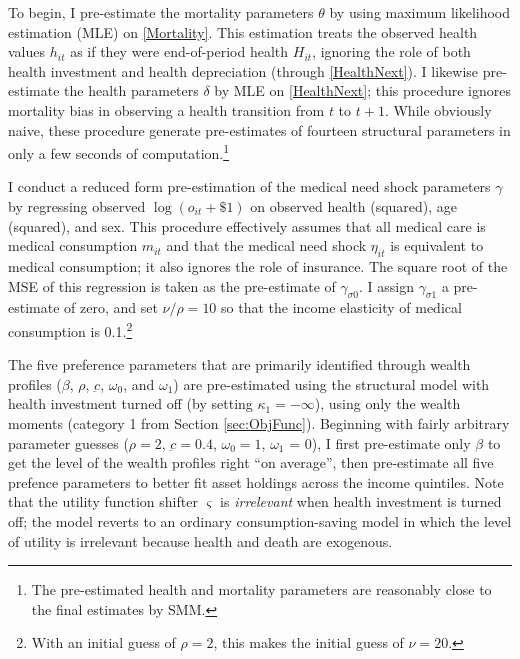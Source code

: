 \documentclass[12pt,pdftex,letterpaper]{article}
\newcommand{\Health}{h}
\newcommand{\PostHealth}{H}
\newcommand{\Con}{c}
\newcommand{\Care}{m}
\newcommand{\MedShkParam}{\gamma}
\newcommand{\DiscFac}{\beta}
\newcommand{\OOP}{o}
\newcommand{\ConFloor}{\underbar{\Con}}
\newcommand{\LifeUtility}{\varsigma}
\newcommand{\CRRAcon}{\rho}
\newcommand{\CRRAcare}{\nu}
\newcommand{\HealthParam}{\delta}
\newcommand{\MedShk}{\eta}
\newcommand{\MortParam}{\theta}
\newcommand{\BequestParam}{\omega}
\newcommand{\HealthProdParam}{\kappa}
\begin{document}
To begin, I pre-estimate the mortality parameters $\MortParam$ by using maximum likelihood estimation (MLE) on \eqref{Mortality}.  This estimation treats the observed health values $\Health_{it}$ as if they were end-of-period health $\PostHealth_{it}$, ignoring the role of both health investment and health depreciation (through \eqref{HealthNext}).  I likewise pre-estimate the health parameters $\HealthParam$ by MLE on \eqref{HealthNext}; this procedure ignores mortality bias in observing a health transition from $t$ to $t+1$.  While obviously naive, these procedure generate pre-estimates of fourteen structural parameters in only a few seconds of computation.\footnote{The pre-estimated health and mortality parameters are reasonably close to the final estimates by SMM.}

I conduct a reduced form pre-estimation of the medical need shock parameters $\MedShkParam$ by regressing observed $\log(\OOP_{it} + \$1)$ on observed health (squared), age (squared), and sex.  This procedure effectively assumes that all medical care is medical consumption $\Care_{it}$ and that the medical need shock $\MedShk_{it}$ is equivalent to medical consumption; it also ignores the role of insurance.  The square root of the MSE of this regression is taken as the pre-estimate of $\MedShkParam_{\sigma 0}$. I assign $\MedShkParam_{\sigma 1}$ a pre-estimate of zero, and set $\CRRAcare/\CRRAcon = 10$ so that the income elasticity of medical consumption is 0.1.\footnote{With an initial guess of $\CRRAcon = 2$, this makes the initial guess of $\CRRAcare=20$.}

The five preference parameters that are primarily identified through wealth profiles ($\DiscFac$, $\CRRAcon$, $\ConFloor$, $\BequestParam_0$, and $\BequestParam_1$) are pre-estimated using the structural model with health investment turned off (by setting $\HealthProdParam_1 = -\infty$), using only the wealth moments (category 1 from Section \ref{sec:ObjFunc}).  Beginning with fairly arbitrary parameter guesses ($\CRRAcon=2$, $\ConFloor = 0.4$, $\BequestParam_0 = 1$, $\BequestParam_1$ = 0), I first pre-estimate only $\DiscFac$ to get the level of the wealth profiles right ``on average'', then pre-estimate all five prefence parameters to better fit asset holdings across the income quintiles.  Note that the utility function shifter $\LifeUtility$ is \textit{irrelevant} when health investment is turned off; the model reverts to an ordinary consumption-saving model in which the level of utility is irrelevant because health and death are exogenous.
\end{document}
